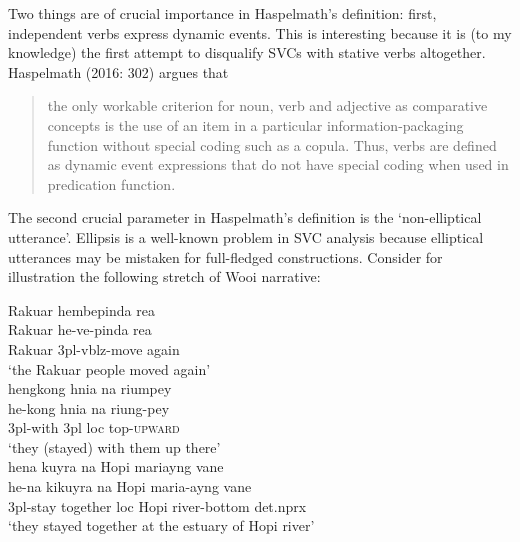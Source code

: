 Two things are of crucial importance in Haspelmath's definition: first, independent verbs express dynamic events. This is interesting because it is (to my knowledge) the first attempt to disqualify SVCs with stative verbs altogether. Haspelmath (2016: 302) argues that \begin{quote}the only workable criterion for noun, verb and adjective as comparative concepts is the use of an item in a particular information-packaging function without special coding such as a copula. Thus, verbs are defined as dynamic event expressions that do not have special coding when used in predication function.\end{quote}

The second crucial parameter in Haspelmath's definition is the `non-elliptical utterance'. Ellipsis is a well-known problem in SVC analysis because elliptical utterances may be mistaken for full-fledged constructions. Consider for illustration the following stretch of Wooi narrative:


\pex 
\a
\gll Rakuar hembepinda rea \\
Rakuar he-ve-pinda rea \\
\glc Rakuar \acs{3}\acs{pl}-\acs{vblz}-move again \\
\glft `the Rakuar people moved again' \\ 
\z
\a \label{wooi-kong}
\gla hengkong hnia na riumpey \\
he-kong hnia na riung-pey \\
\glc \acs{3}\acs{pl}-with \acs{3}\acs{pl} \acs{loc} top-\textsc{upward} \\
\glft `they (stayed) with them up there' \\ 
\z
\a
\gla hena kuyra na Hopi mariayng vane \\ 
he-na kikuyra na Hopi maria-ayng vane \\
\glc \acs{3}\acs{pl}-stay together \acs{loc} Hopi river-bottom \acs{det}.\acs{nprx} \\
\glft `they stayed together at the estuary of Hopi river' \\ 
\z
\xe

